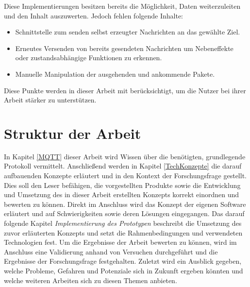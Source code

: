     Diese Implementierungen besitzen bereits die Möglichkeit, Daten weiterzuleiten und den Inhalt auszuwerten. Jedoch fehlen folgende Inhalte:
    \begin{itemize}
        \item Schnittstelle zum senden selbst erzeugter Nachrichten an das gewählte Ziel.
        \item Erneutes Versenden von bereits gesendeten Nachrichten um Nebeneffekte oder zustandsabhängige Funktionen zu erkennen.
        \item Manuelle Manipulation der ausgehenden und ankommende Pakete.
    \end{itemize}
    
    Diese Punkte werden in dieser Arbeit mit berücksichtigt, um die Nutzer bei ihrer Arbeit stärker zu unterstützen.

\section{Struktur der Arbeit}
    In Kapitel \ref{MQTT} dieser Arbeit wird Wissen über die benötigten, grundlegende Protokoll vermittelt.
    Anschließend werden in Kapitel \ref{TechKonzepte} die darauf aufbauenden Konzepte erläutert und in den Kontext der Forschungsfrage gestellt.
    Dies soll den Leser befähigen, die vorgestellten Produkte sowie die Entwicklung und Umsetzung des in dieser Arbeit erstellten Konzepts korrekt einordnen und bewerten zu können.
    Direkt im Anschluss wird das Konzept der eigenen Software erläutert und auf Schwierigkeiten sowie deren Lösungen eingegangen. Das darauf folgende Kapitel \emph{Implementierung des Prototypen} beschreibt die Umsetzung des zuvor erläuterten Konzepts und setzt die Rahmenbedingungen und verwendeten Technologien fest. Um die Ergebnisse der Arbeit bewerten zu können, wird im Anschluss eine Validierung anhand von Versuchen durchgeführt und die Ergebnisse der Forschungsfrage festgehalten. Zuletzt wird ein Ausblick gegeben, welche Probleme, Gefahren und Potenziale sich in Zukunft ergeben könnten und welche weiteren Arbeiten sich zu diesen Themen anbieten.